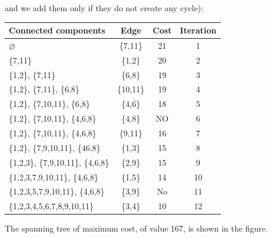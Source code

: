 \documentclass[12pt, a4paper]{report}
\begin{document}
\begin{enumerate}
                and we add them only if they do not create any cycle): 
                \begin{table}[H]
                    \centering
                    \begin{tabular}{lccc}
                    \hline
                    \textbf{Connected components}       & \textbf{Edge} & \textbf{Cost} & \textbf{Iteration} \\ \hline
                    $\varnothing$                       & \{7,11\}      & 21            & 1                  \\
                    \{7,11\}                            & \{1,2\}       & 20            & 2                  \\
                    \{1,2\}, \{7,11\}                   & \{6,8\}       & 19            & 3                  \\
                    \{1,2\}, \{7,11\}, \{6,8\}          & \{10,11\}     & 19            & 4                  \\
                    \{1,2\}, \{7,10,11\}, \{6,8\}       & \{4,6\}       & 18            & 5                  \\
                    \{1,2\}, \{7,10,11\}, \{4,6,8\}     & \{4,8\}       & NO            & 6                  \\
                    \{1,2\}, \{7,10,11\}, \{4,6,8\}     & \{9,11\}      & 16            & 7                  \\
                    \{1,2\}, \{7,9,10,11\}, \{46,8\}    & \{1,3\}       & 15            & 8                  \\
                    \{1,2,3\}, \{7,9,10,11\}, \{4,6,8\} & \{2,9\}       & 15            & 9                  \\
                    \{1,2,3,7,9,10,11\}, \{4,6,8\}      & \{1,5\}       & 14            & 10                 \\
                    \{1,2,3,5,7,9,10,11\}, \{4,6,8\}    & \{3,9\}       & No            & 11                 \\
                    \{1,2,3,4,5,6,7,8,9,10,11\}         & \{3,4\}       & 10            & 12                 \\ \hline
                    \end{tabular}
                \end{table}
                The spanning tree of maximum cost, of value 167, is shown in the figure. 
                \begin{figure}[H]
                    \centering

\end{figure}
\end{enumerate}
\end{document}
